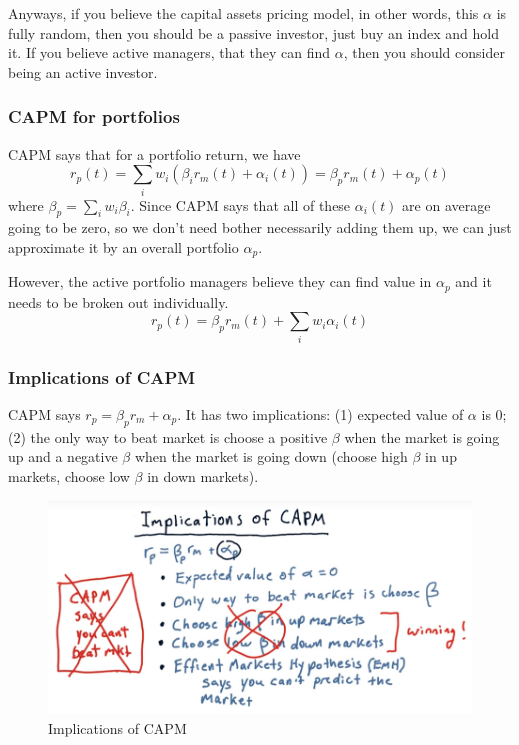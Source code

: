 \documentclass[12pt]{article}
\begin{document}
Anyways, if you believe the capital assets pricing model, in other words, this $\alpha$ is fully random, then you should be a passive investor, just buy an index and hold it. If you believe active managers, that they can find $\alpha$, then you should consider being an active investor. 

\subsubsection{CAPM for portfolios}

CAPM says that for a portfolio return, we have
\begin{equation}
r_p(t) = \sum_iw_i(\beta_ir_m(t) + \alpha_i(t)) = \beta_pr_m(t) + \alpha_p(t)
\end{equation}
where $\beta_p = \sum_iw_i\beta_i$. Since CAPM says that all of these $\alpha_i(t)$ are on average going to be zero, so we don't need bother necessarily adding them up, we can just approximate it by an overall portfolio $\alpha_p$.

However, the active portfolio managers believe they can find value in $\alpha_p$ and it needs to be broken out individually. 
\begin{equation}
r_p(t) =  \beta_pr_m(t) + \sum_i{w_i\alpha_i(t)}
\end{equation}

\subsubsection{Implications of CAPM}

CAPM says $r_p = \beta_pr_m + \alpha_p$. It has two implications: (1) expected value of $\alpha$ is 0; (2) the only way to beat market is choose a positive $\beta$ when the market is going up and a negative $\beta$ when the market is going down (choose high $\beta$ in up markets, choose low $\beta$ in down markets). 

\begin{figure}[!ht]
\centering
\includegraphics[scale=0.45]{fig/fig39}
\caption{Implications of CAPM}
\end{figure}
\end{document}
